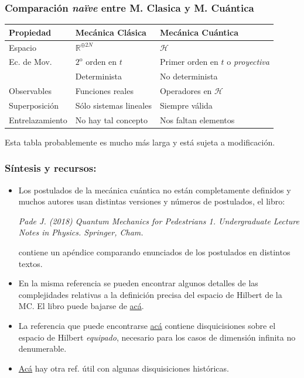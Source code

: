 \documentclass{beamer}
\begin{document}
\begin{frame}
    \frametitle{Comparación {\em naïve} entre M. Clasica y M. Cuántica}

    \begin{table}[]
        \begin{tabular}{@{}lll@{}}
        \toprule
         Propiedad     & Mecánica Clásica & Mecánica Cuántica \\ \midrule
         Espacio       & $\mathbb{R}^{\oplus 2N}$  & $\mathcal{H}$ \\
         Ec. de Mov.   & $2^\mathrm{o}$ orden en $t$ & Primer orden en $t$ o {\em proyectiva} \\
                       & Determinista & No determinista \\
         Observables   & Funciones reales & Operadores en $\mathcal{H}$ \\
         Superposición & Sólo sistemas lineales & Siempre válida \\
         Entrelazamiento & No hay tal concepto & Nos faltan elementos 
        \end{tabular}
    \end{table}
    Esta tabla probablemente es mucho más larga y está sujeta a modificación.

    
\end{frame}
\begin{frame}
\frametitle{Síntesis y recursos:}

\begin{itemize}
\item Los postulados de la mecánica cuántica no están completamente definidos y muchos autores usan distintas versiones y números de postulados, el libro:

{\em
Pade J. (2018) Quantum Mechanics for Pedestrians 1. Undergraduate Lecture Notes in Physics. Springer, Cham. 
}

contiene un apéndice comparando enunciados de los postulados en distintos textos.
\item En la misma referencia se pueden encontrar algunos detalles de las complejidades relativas a la definición precisa del espacio de Hilbert de la MC. El libro puede bajarse de \href{https://drive.google.com/file/d/1x4HimKd4pGmha6Pf5P8P0gmTKOPw5yB1/view?usp=sharing}{acá}.
\item La referencia que puede encontrarse \href{https://arxiv.org/abs/quant-ph/0502053}{acá} contiene disquicisiones sobre el espacio de Hilbert {\em equipado}, necesario para los casos de dimensión infinita no denumerable.
\item \href{https://drive.google.com/file/d/1Lw82HUBh5z47VLFZMW0PN0bp3Wa7zz9b/view?usp=sharing}{Acá} hay otra ref. útil con algunas disquisiciones históricas.
\end{itemize}
\end{frame}
\end{document}
